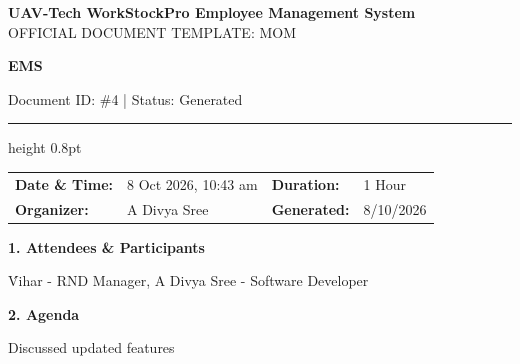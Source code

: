 \documentclass[11pt,a4paper]{article}
\begin{document}
\begin{tcolorbox}[
  colback=bannerblue,
  colframe=bannerblue,
  arc=0mm,
  boxrule=0pt,
  left=14pt,
  right=14pt,
  top=12pt,
  bottom=12pt
]
  {\Large \bfseries \color{white} UAV-Tech WorkStockPro \quad Employee Management System} \\[3pt]
  {\small \color{white!85} OFFICIAL DOCUMENT TEMPLATE: MOM}
\end{tcolorbox}

\vspace{0.3cm}

{\Huge \bfseries \color{titleblue} EMS}

\vspace{0.15cm}

{\small \color{subtletext} Document ID: \#4 | Status: Generated}

\vspace{0.2cm}

{\color{bannerblue}\hrule height 0.8pt}

\vspace{0.3cm}

\begin{tcolorbox}[
  colback=cardbg,
  colframe=cardbg,
  arc=1.5mm,
  boxrule=0pt,
  left=14pt,
  right=14pt,
  top=10pt,
  bottom=10pt
]
  \begin{tabularx}{\linewidth}{@{} p{2.6cm} X p{2.4cm} X @{}}
    \textbf{Date \& Time:} & 8 Oct 2026, 10:43 am & \textbf{Duration:} & 1 Hour \\[6pt]
    \textbf{Organizer:} & A Divya Sree & \textbf{Generated:} & 8/10/2026
  \end{tabularx}
\end{tcolorbox}

\vspace{0.4cm}

{\large \bfseries \color{titleblue} 1. Attendees \& Participants}

\vspace{0.15cm}

\' Vihar - RND Manager, A Divya Sree - Software Developer

\vspace{0.4cm}

{\large \bfseries \color{titleblue} 2. Agenda}

\vspace{0.15cm}

Discussed updated features
\end{document}

